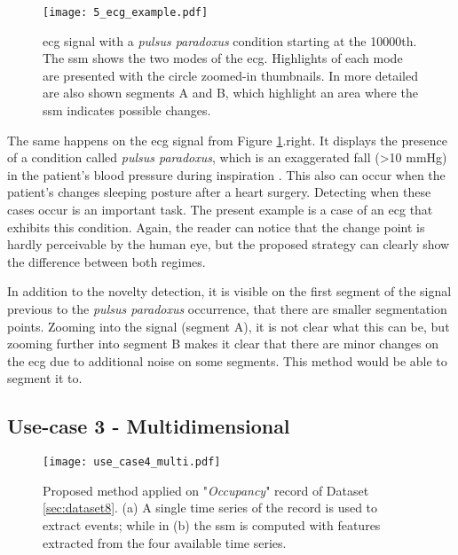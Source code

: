 {\begin{figure}
    \centering
    \texttt{[image: 5\_ecg\_example.pdf]}
    \caption{\gls{ecg} signal with a \textit{pulsus paradoxus} condition starting at the 10000th. The \gls{ssm} shows the two modes of the \gls{ecg}. Highlights of each mode are presented with the circle zoomed-in thumbnails. In more detailed are also shown segments A and B, which highlight an area where the \gls{ssm} indicates possible changes.}
    \label{fig:example2_3}
\end{figure}

The same happens on the \gls{ecg} signal from Figure \ref{fig:example2_3}.right. It displays the presence of a condition called \textit{pulsus paradoxus}, which is an exaggerated fall (>10 mmHg) in the patient's blood pressure during inspiration \cite{pulsusparadoxus2}. This also can occur when the patient's changes sleeping posture after a heart surgery\cite{eamonn_segmentation}. Detecting when these cases occur is an important task. The present example is a case of an \gls{ecg} that exhibits this condition.
Again, the reader can notice that the change point is hardly perceivable by the human eye, but the proposed strategy can clearly show the difference between both regimes.
\par
In addition to the novelty detection, it is visible on the first segment of the signal previous to the \textit{pulsus paradoxus} occurrence, that there are smaller segmentation points. Zooming into the signal (segment A), it is not clear what this can be, but zooming further into segment B makes it clear that there are minor changes on the \gls{ecg} due to additional noise on some segments. This method would be able to segment it to.

\subsection{Use-case 3 - Multidimensional}

\begin{figure}
    \centering
    \texttt{[image: use\_case4\_multi.pdf]}
    \caption{Proposed method applied on "\textit{Occupancy}" record of Dataset \ref{sec:dataset8}. (a) A single time series of the record is used to extract events; while in (b) the \gls{ssm} is computed with features extracted from the four available time series.}
    \label{fig:example4}
\end{figure}

}
